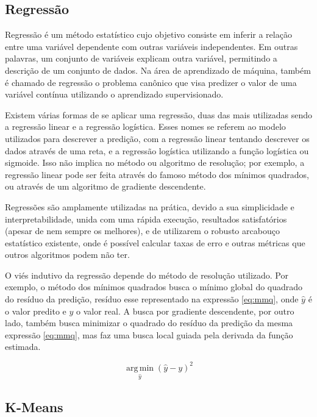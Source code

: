 \documentclass{article}
\begin{document}
\subsection{Regressão}

Regressão é um método estatístico cujo objetivo consiste em inferir a relação entre uma variável dependente com outras variáveis independentes.
Em outras palavras, um conjunto de variáveis explicam outra variável, permitindo a descrição de um conjunto de dados.
Na área de aprendizado de máquina, também é chamado de regressão o problema canônico
que visa predizer o valor de uma variável contínua utilizando o aprendizado supervisionado.

Existem várias formas de se aplicar uma regressão,
duas das mais utilizadas sendo a regressão linear e a regressão logística.
Esses nomes se referem ao modelo utilizados para descrever a predição,
com a regressão linear tentando descrever os dados através de uma reta,
e a regressão logística utilizando a função logística ou sigmoide.
Isso não implica no método ou algoritmo de resolução;
por exemplo, a regressão linear pode ser feita
através do famoso método dos mínimos quadrados,
ou através de um algoritmo de gradiente descendente.

Regressões são amplamente utilizadas na prática,
devido a sua simplicidade e interpretabilidade,
unida com uma rápida execução, resultados satisfatórios (apesar de nem sempre os melhores),
e de utilizarem o robusto arcabouço estatístico existente,
onde é possível calcular taxas de erro e outras métricas que outros algoritmos podem não ter.

O viés indutivo da regressão depende do método de resolução utilizado.
Por exemplo, o método dos mínimos quadrados busca o mínimo global
do quadrado do resíduo da predição, resíduo esse representado na expressão \ref{eq:mmq},
onde $\hat{y}$ é o valor predito e $y$ o valor real.
A busca por gradiente descendente, por outro lado,
também busca minimizar o quadrado do resíduo da predição da mesma expressão \ref{eq:mmq},
mas faz uma busca local guiada pela derivada da função estimada.

\begin{equation}
\operatorname*{arg\,min}_{\hat{y}} (\hat{y} - y)^2
\label{eq:mmq}
\end{equation}


\subsection{K-Means}
\end{document}
